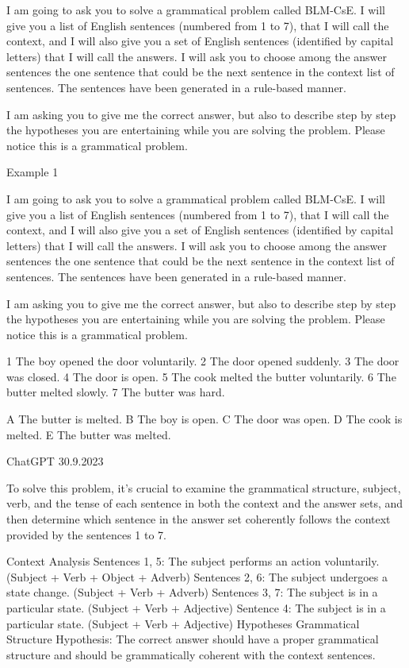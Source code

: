 I am going to ask you to solve a grammatical problem called BLM-CsE.  I will give you a list of English sentences (numbered from 1 to 7), that I will call the context, and I will also give you a set of English sentences (identified by capital letters) that I will call  the answers. I will ask you to choose among the answer sentences the one sentence that could be the next sentence in the context list of sentences. The sentences have been generated in a rule-based manner. 

I am asking you to give me the correct answer, but also to describe step by step  the hypotheses you are entertaining while you are solving the problem. Please notice this is a grammatical problem.

Example 1 

I am going to ask you to solve a grammatical problem called BLM-CsE.  I will give you a list of English sentences (numbered from 1 to 7), that I will call the context, and I will also give you a set of English sentences (identified by capital letters) that I will call  the answers. I will ask you to choose among the answer sentences the one sentence that could be the next sentence in the context list of sentences. The sentences have been generated in a rule-based manner. 

I am asking you to give me the correct answer, but also to describe step by step  the hypotheses you are entertaining while you are solving the problem. Please notice this is a grammatical problem.


1  The boy opened the door voluntarily.
2  The door opened suddenly.
3  The door was closed.
4  The door is open.
5  The cook melted the butter voluntarily.
6  The butter melted slowly.
7  The butter was hard.

A  The butter is melted.
B  The boy is open.
C  The door was open.
D  The cook is melted.
E  The butter was melted.

ChatGPT 30.9.2023

To solve this problem, it’s crucial to examine the grammatical structure, subject, verb, and the tense of each sentence in both the context and the answer sets, and then determine which sentence in the answer set coherently follows the context provided by the sentences 1 to 7.

Context Analysis
Sentences 1, 5: The subject performs an action voluntarily. (Subject + Verb + Object + Adverb)
Sentences 2, 6: The subject undergoes a state change. (Subject + Verb + Adverb)
Sentences 3, 7: The subject is in a particular state. (Subject + Verb + Adjective)
Sentence 4: The subject is in a particular state. (Subject + Verb + Adjective)
Hypotheses
Grammatical Structure Hypothesis: The correct answer should have a proper grammatical structure and should be grammatically coherent with the context sentences.

